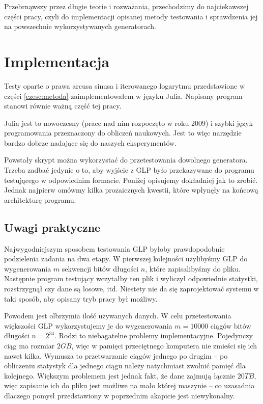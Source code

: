\documentclass[a4paper,11pt,twoside]{book}
\theoremstyle{definition}
\begin{document}
Przebrnąwszy przez długie teorie i rozważania, przechodzimy do najciekawszej części pracy, czyli do implementacji opisanej metody testowania i sprawdzenia jej na powszechnie wykorzystywanych generatorach.

\section{Implementacja}
Testy oparte o prawa arcusa sinusa i iterowanego logarytmu przedstawione w części \ref{czesc:metoda} zaimplementowałem w języku Julia. Napisany program stanowi równie ważną część tej pracy.

Julia jest to nowoczesny (prace nad nim rozpoczęto w roku 2009) i szybki język programowania przeznaczony do obliczeń naukowych. Jest to więc narzędzie bardzo dobrze nadające się do naszych eksperymentów.

Powstały skrypt można wykorzystać do przetestowania dowolnego generatora. Trzeba zadbać jedynie o to, aby wyjście z GLP było przekazywane do programu testującego w odpowiednim formacie. Poniżej opisujemy dokładniej jak to zrobić. Jednak najpierw omówmy kilka prozaicznych kwestii, które wpłynęły na końcową architekturę programu.

\subsection{Uwagi praktyczne}
Najwygodniejszym sposobem testowania GLP byłoby prawdopodobnie podzielenia zadania na dwa etapy. W pierwszej kolejności użylibyśmy GLP do wygenerowania $m$ sekwencji bitów długości $n$, które zapisalibyśmy do pliku. Następnie program testujący wczytałby ten plik i wyliczył odpowiednie statystki, rozstrzygnął czy dane są losowe, itd. Niestety nie da się zaprojektować systemu w taki sposób, aby opisany tryb pracy był możliwy.

Powodem jest olbrzymia ilość używanych danych. W celu przetestowania większości GLP wykorzystujemy je do wygenerowania $m = 10000$ ciągów bitów długości $n = 2^{34}$. Rodzi to niebagatelne problemy implementacyjne. Pojedynczy ciąg ma rozmiar $2GB$, więc w pamięci przeciętnego komputera nie zmieści się ich nawet kilka. Wymusza to przetwarzanie ciągów jednego po drugim -- po obliczeniu statystyk dla jednego ciągu należy natychmiast zwolnić pamięć dla kolejnego. Większym problemem jest jednak fakt, że dane zajmują łącznie $20TB$, więc zapisanie ich do pliku jest możliwe na mało której maszynie -- co uzasadnia dlaczego pomysł przedstawiony w poprzednim akapicie jest niewykonalny.
\end{document}
